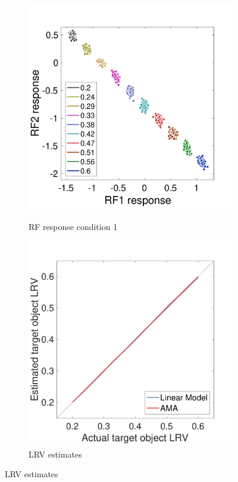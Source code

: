 \documentclass{jov}
\begin{document}
\begin{figure}
\centering
        \begin{subfigure}[b]{0.3 \textwidth}
        \caption{RF response condition 1}
        \includegraphics[width=\textwidth]{../FiguresDraft4/Figure10/Figure10_a.pdf}
        \label{fig:case1RFResponse}
    \end{subfigure}    
            \begin{subfigure}[b]{0.3 \textwidth}
        \caption{LRV estimates}
        \includegraphics[width=\textwidth]{../FiguresDraft4/Figure10/Figure10_b.pdf}

\end{subfigure}
\end{figure}
\end{document}

